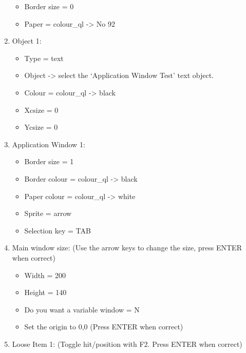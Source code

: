 \begin{enumerate}
{\begin{itemize}[itemsep=0pt]
\item{}Border size = 0

\item{}Paper = colour\_ql -{}>{} No 92

\end{itemize}
}
\item{Object 1:
\begin{itemize}[itemsep=0pt]

\item{}Type = text

\item{}Object -{}>{} select the `Application Window Test' text
            object.

\item{}Colour = colour\_ql -{}>{} black

\item{}Xcsize = 0

\item{}Ycsize = 0

\end{itemize}
}
\item{Application Window 1:
\begin{itemize}[itemsep=0pt]

\item{}Border size = 1

\item{}Border colour = colour\_ql -{}>{} black

\item{}Paper colour = colour\_ql -{}>{} white

\item{}Sprite = arrow

\item{}Selection key = TAB

\end{itemize}
}
\item{Main window size: (Use the arrow keys to change the size, press
        ENTER when correct)
\begin{itemize}[itemsep=0pt]

\item{}Width = 200

\item{}Height = 140

\item{}Do you want a variable window = N

\item{}Set the origin to 0,0 (Press ENTER when correct)

\end{itemize}
}
\item{Loose Item 1: (Toggle hit/position with F2. Press ENTER when
        correct)
\begin{itemize}[itemsep=0pt]


\end{itemize}}
\end{enumerate}
